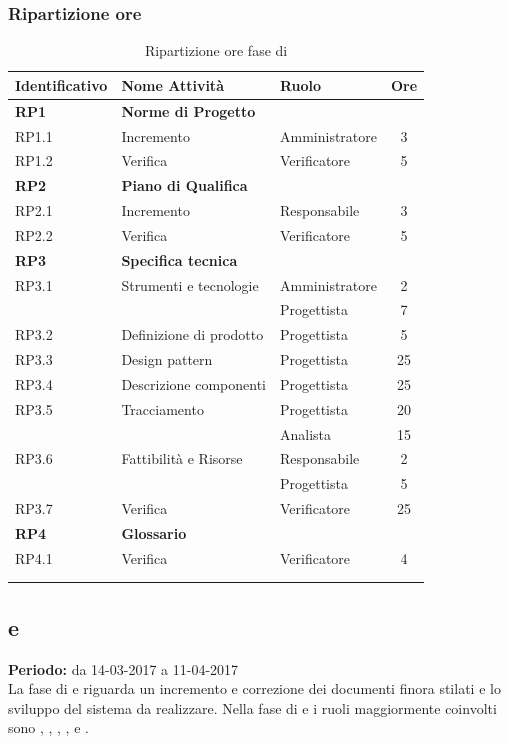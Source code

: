 \subsubsection{Ripartizione ore}
\bgroup
\begin{longtable}{|l|l|l|c|}
	\endfirsthead
	\hline
	\textbf{Identificativo} &
	\textbf{Nome Attività} &
	\textbf{Ruolo} &
	\textbf{Ore}\\
	\endhead
	\hline
	\textbf{RP1} & \textbf{Norme di Progetto} &  &  \\
	\hline
	{RP1.1} & {Incremento} & Amministratore  & 3\\
	\hline
	{RP1.2} & {Verifica} & Verificatore & 5 \\
	\hline
	\textbf{RP2} & \textbf{Piano di Qualifica}  & & \\
	\hline
	{RP2.1} & {Incremento} & Responsabile &  3\\
	\hline
	{RP2.2} & {Verifica} & Verificatore & 5 \\
	\hline
	\textbf{RP3} & \textbf{Specifica tecnica} & &  \\
	\hline
	{RP3.1} & {Strumenti e tecnologie} & Amministratore  &  2\\
	& & Progettista & 7 \\
	\hline
	{RP3.2} & {Definizione di prodotto} & Progettista  &  5\\
	\hline
	{RP3.3} & {Design pattern} & Progettista  &  25\\
	\hline
	{RP3.4} & {Descrizione componenti} & Progettista  &  25\\
	\hline
	{RP3.5} & {Tracciamento} & Progettista  &  20\\
	& & Analista & 15 \\
	\hline
	{RP3.6} & {Fattibilità e Risorse} & Responsabile  &  2\\
	& & Progettista & 5 \\
	\hline
	{RP3.7} & {Verifica} & Verificatore  &  25\\
	\hline
	\textbf{RP4} & \textbf{Glossario} & &  \\
	\hline
	{RP4.1} & {Verifica} & Verificatore &  4 \\
	\hline
	\\
	\caption{Ripartizione ore fase di \PA{}}
\end{longtable}
\egroup

\subsection{\PD{} e \Cod{}}
\textbf{Periodo:} da 14-03-2017 a 11-04-2017 \\
 La fase di \PD{} e \Cod{} riguarda un incremento e correzione dei documenti finora stilati e lo sviluppo del sistema da realizzare.
Nella fase di \PD{} e \Cod{} i ruoli maggiormente coinvolti sono \Programmatore{}, \Progettista{}, \Analista{}, \Responsabile{}, \Amministratore{} e \Verificatore{}.
